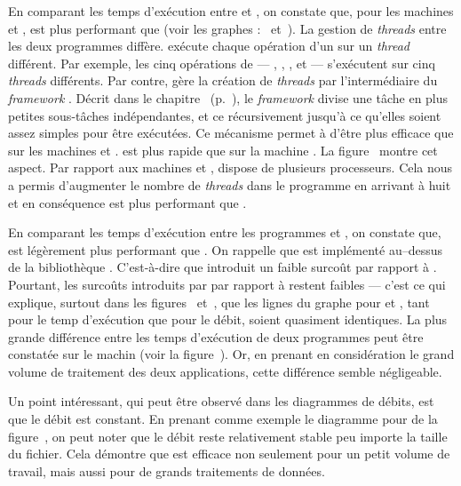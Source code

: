 En comparant les temps d'ex\'ecution entre  et , on constate que, pour les machines  et ,  est plus performant que  (voir les graphes :~ et~). La gestion de \emph{threads} entre les deux programmes diff\`ere.  ex\'ecute chaque op\'eration d'un  sur un \emph{thread} diff\'erent. Par exemple, les cinq op\'erations de  --- , , ,  et  --- s'ex\'ecutent sur cinq \emph{threads} diff\'erents. Par contre,  g\`ere la cr\'eation de \emph{threads} par l'interm\'ediaire du \emph{framework} . D\'ecrit dans le chapitre~ (p.~\pageref{forkjoin.sect}), le \emph{framework} divise une t\^ache en plus petites sous-t\^aches ind\'ependantes, et ce r\'ecursivement jusqu'\`a ce qu'elles soient assez simples pour \^etre ex\'ecut\'ees. Ce m\'ecanisme permet \`a  d'\^etre plus efficace que  sur les machines  et .  est plus rapide que  sur la machine . La figure~ montre cet aspect. Par rapport aux machines  et ,  dispose de plusieurs processeurs. Cela nous a permis d'augmenter le nombre de \emph{threads} dans le programme  en arrivant \`a huit et en cons\'equence  est plus performant que . 


En comparant les temps d'ex\'ecution entre les programmes  et , on constate que,  est l\'eg\`erement plus performant que . On rappelle que  est impl\'ement\'e au–dessus de la biblioth\`eque . C'est-\`a-dire que  introduit un faible surco\^ut par rapport \`a . Pourtant, les surco\^uts introduits par  par rapport \`a  restent faibles — c'est ce qui explique, surtout dans les figures~ et~, que les lignes du graphe pour  et , tant pour le temp d'ex\'ecution que pour le d\'ebit, soient quasiment identiques. La plus grande diff\'erence entre les temps d'ex\'ecution de deux programmes peut \^etre constat\'ee sur le machin  (voir la figure~). Or, en prenant en consid\'eration le grand volume de traitement des deux applications, cette diff\'erence semble n\'egligeable.

Un point int\'eressant, qui peut \^etre observ\'e dans les diagrammes de d\'ebits, est que le d\'ebit est constant. En prenant comme exemple le diagramme pour  de la figure~, on peut noter que le d\'ebit reste relativement stable peu importe la taille du fichier. Cela d\'emontre que  est efficace non seulement pour un petit volume de travail, mais aussi pour de grands traitements de donn\'ees.





